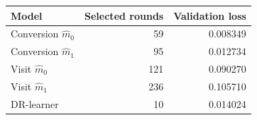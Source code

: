 \begin{tabular}{@{}lrr@{}}
\toprule
Model & Selected rounds & Validation loss \\
\midrule
Conversion $\widehat m_0$ & 59 & 0.008349 \\
Conversion $\widehat m_1$ & 95 & 0.012734 \\
Visit $\widehat m_0$ & 121 & 0.090270 \\
Visit $\widehat m_1$ & 236 & 0.105710 \\
DR-learner & 10 & 0.014024 \\
\bottomrule
\end{tabular}
